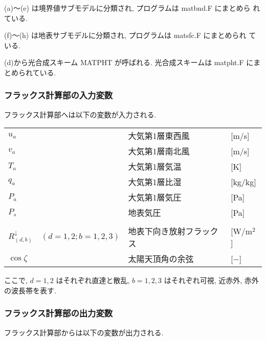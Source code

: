 (a)〜(e) は境界値サブモデルに分類され, プログラムは matbnd.F にまとめら
れている. 

(f)〜(h) は地表サブモデルに分類され, プログラムは matsfc.F にまとめられ
ている. 

(d)から光合成スキーム MATPHT が呼ばれる. 光合成スキームは matpht.F にま
とめられている. 

\subsubsection{フラックス計算部の入力変数}

フラックス計算部へは以下の変数が入力される. 

\begin{tabular}{llll}
$u_a$          &                     & 大気第1層東西風 & [m/s] \\
$v_a$          &                     & 大気第1層南北風 & [m/s] \\
$T_a$          &                     & 大気第1層気温   & [K]   \\
$q_a$          &                     & 大気第1層比湿   & [kg/kg]\\
$P_a$          &                     & 大気第1層気圧   & [Pa]  \\
$P_s$          &                     & 地表気圧        & [Pa]  \\
\\
$R^{\downarrow}_{(d,b)}$ & $(d=1,2;b=1,2,3)$ & 地表下向き放射フラックス & [W/m$^2$]\\
$\cos\zeta$    &                     & 太陽天頂角の余弦 & [$-$]\\
\end{tabular}
\medskip

ここで, $d=1,2$ はそれぞれ直達と散乱, $b=1,2,3$ はそれぞれ可視, 近赤外, 赤外の波長帯を表す. 

\subsubsection{フラックス計算部の出力変数}

フラックス計算部からは以下の変数が出力される. 

